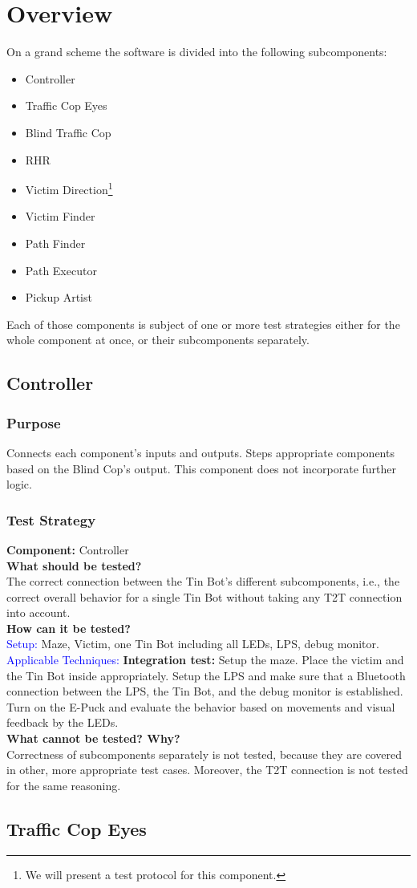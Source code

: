 \documentclass[a4paper,parskip,headheight=38pt]{scrartcl} %
\newcommand{\teststrat}[5]{
    \subsubsection{Test Strategy}
	\textbf{Component:} #1 \\
	\noindent\textbf{What should be tested?} \\
    \noindent #2 \\
	\noindent\textbf{How can it be tested?} \\
    \noindent\textcolor{blue}{Setup:} #3 \\
    \noindent\textcolor{blue}{Applicable Techniques:} #4 \\
	\noindent\textbf{What cannot be tested? Why?} \\
    \noindent #5
}
\newcommand{\ie}{i.e.}
\newcommand{\BLACK}{\textbf{Integration test: }}
\begin{document}
\section{Overview}

On a grand scheme the software is divided into the following subcomponents:

\begin{itemize}
	\item Controller
	\item Traffic Cop Eyes
	\item Blind Traffic Cop 
	\item RHR
	\item Victim Direction\footnote{We will present a test protocol
   for this component.}
	\item Victim Finder
	\item Path Finder
	\item Path Executor
	\item Pickup Artist
\end{itemize}

Each of those components is subject of one or more test strategies either for
the whole component at once, or their subcomponents separately.
\subsection{Controller}
\subsubsection{Purpose}
	Connects each component's inputs and outputs. Steps appropriate components
    based on the Blind Cop's output. This component does not incorporate further
    logic.
\teststrat{Controller}{
    The correct connection between the Tin Bot's different subcomponents, \ie,
    the correct overall behavior for a single Tin Bot without taking any T2T
    connection into account.
}{
    Maze, Victim, one Tin Bot including all LEDs, LPS, debug monitor.
}{
    \BLACK Setup the maze. Place the victim and the Tin Bot inside
    appropriately. Setup
    the LPS and make sure that a Bluetooth connection between the LPS, the Tin
    Bot, and the debug monitor is established. Turn on the E-Puck and evaluate
    the behavior based on movements and visual feedback by the LEDs.
}{
    Correctness of subcomponents separately is not tested, because they are
    covered in other, more appropriate test cases. Moreover, the T2T connection
    is not tested for the same reasoning.
}
%
\subsection{Traffic Cop Eyes}
\end{document}
